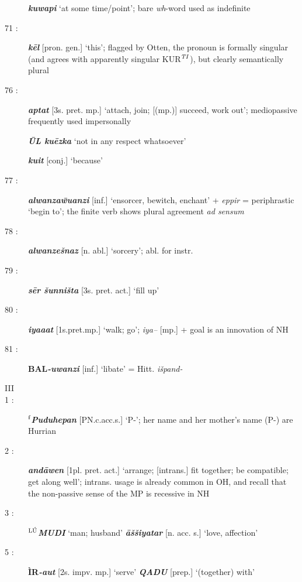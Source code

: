 \documentclass[10pt]{article}
\newcommand{\supersc}[1]{$^{\textrm{\scriptsize{#1}}}$}  	%
\newcommand{\bit}[1]{\textbf{\textit{#1}}}				%
\newcommand{\p}[1]{{\tiny[{#1}]}}					%
\newcommand{\hith}{\textsubwedge{h}}
\newcommand{\man}{\supersc{L\'U}}
\renewcommand{\.}[1]{\textsubdot{#1}}
\begin{document}
\begin{description}
\bit{kuwapi} `at some time/point'; bare \textit{wh}-word used as indefinite

\item[71 :] \bit{k\=el} \p{pron. gen.} `this'; flagged by Otten, the pronoun is formally singular (and agrees with apparently singular KUR\supersc{\textit{TI}}), but clearly semantically plural

\item[76 :] \bit{{\hith}aptat} \p{3s. pret. mp.} `attach, join; \p{(mp.)} succeed, work out'; mediopassive frequently used impersonally 

\bit{\=UL ku\=ezka} `not in any respect whatsoever' 

\bit{kuit} \p{conj.} `because'

\item[77 :] \bit{alwanza{\hith\hith}\=wuanzi} \p{inf.} `ensorcer, bewitch, enchant' + \textit{eppir} = periphrastic `begin to'; the finite verb shows plural agreement \textit{ad sensum}

\item[78 :] \bit{alwanze\v{s}naz} \p{n. abl.} `sorcery'; abl. for instr.

\item[79 :] \bit{s\=er \v{s}unni\v{s}ta} \p{3s. pret. act.} `fill up'

\item[80 :] \bit{iya{\hith}{\hith}a{\hith}at} \p{1s.pret.mp.} `walk; go'; \textit{iya--} \p{mp.} + goal is an innovation of NH

\item[81 :] \textbf{BAL}\bit{-uwanzi} \p{inf.} `libate' = Hitt. \textit{i\v{s}pand-}

\smallskip
\item[III]
\smallskip

\item[1 :] {\bf \supersc{f}}\bit{Puduhepan} \p{PN.c.acc.s.} `P-'; her name and her mother's name (P-) are Hurrian

\item[2 :] \bit{{\hith}and\=awen} \p{1pl. pret. act.} `arrange; \p{intrans.} fit together; be compatible; get along well'; intrans. usage is already common in OH, and recall that the non-passive sense of the MP is recessive in NH

\item[3 :] \textbf{\man}\bit{MUDI} `man; husband' \bit{\=a\v{s}\v{s}iyatar} \p{n. acc. s.} `love, affection'

\item[5 :] \textbf{\`IR}\bit{-a{\hith\hith}ut} \p{2s. impv. mp.} `serve' \bit{QADU} \p{prep.} `(together) with'


\end{description}
\end{document}

